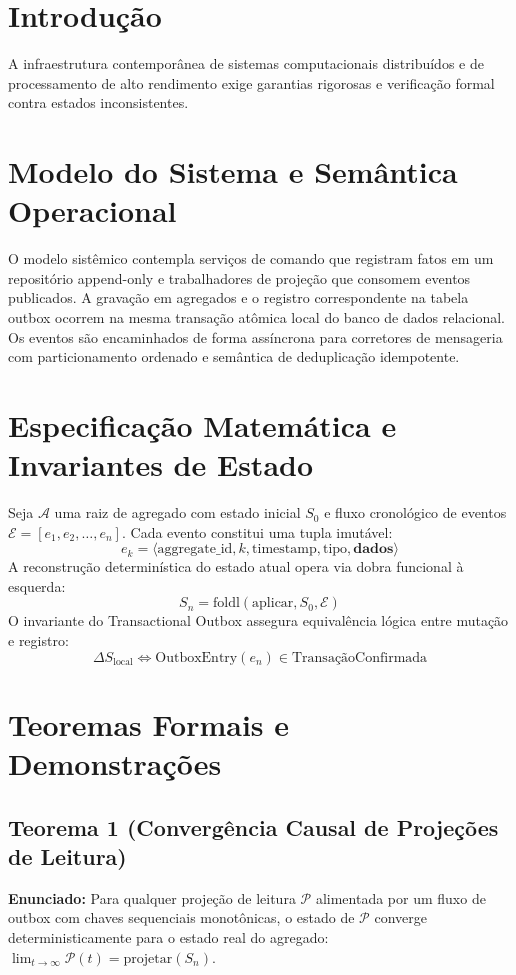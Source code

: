 \documentclass[
  article,
  12pt,
  oneside,
  a4paper,
  english,
  brazil
]{abntex2}
\begin{document}
\section{Introdução}
A infraestrutura contemporânea de sistemas computacionais distribuídos e de processamento de alto rendimento exige garantias rigorosas e verificação formal contra estados inconsistentes.

\section{Modelo do Sistema e Semântica Operacional}
O modelo sistêmico contempla serviços de comando que registram fatos em um repositório append-only e trabalhadores de projeção que consomem eventos publicados. A gravação em agregados e o registro correspondente na tabela outbox ocorrem na mesma transação atômica local do banco de dados relacional. Os eventos são encaminhados de forma assíncrona para corretores de mensageria com particionamento ordenado e semântica de deduplicação idempotente.

\section{Especificação Matemática e Invariantes de Estado}
Seja $\mathcal{A}$ uma raiz de agregado com estado inicial $S_0$ e fluxo cronológico de eventos $\mathcal{E} = [e_1, e_2, \dots, e_n]$.
Cada evento constitui uma tupla imutável:
$$e_k = \langle \text{aggregate\_id}, k, \text{timestamp}, \text{tipo}, \mathbf{dados} \rangle$$
A reconstrução determinística do estado atual opera via dobra funcional à esquerda:
$$S_n = \text{foldl}(\text{aplicar}, S_0, \mathcal{E})$$
O invariante do Transactional Outbox assegura equivalência lógica entre mutação e registro:
$$\Delta S_{\text{local}} \iff \text{OutboxEntry}(e_n) \in \text{TransaçãoConfirmada}$$

\section{Teoremas Formais e Demonstrações}
\subsection{Teorema 1 (Convergência Causal de Projeções de Leitura)}
\textbf{Enunciado:} Para qualquer projeção de leitura $\mathcal{P}$ alimentada por um fluxo de outbox com chaves sequenciais monotônicas, o estado de $\mathcal{P}$ converge deterministicamente para o estado real do agregado: $\lim_{t \to \infty} \mathcal{P}(t) = \text{projetar}(S_n)$.
\end{document}
